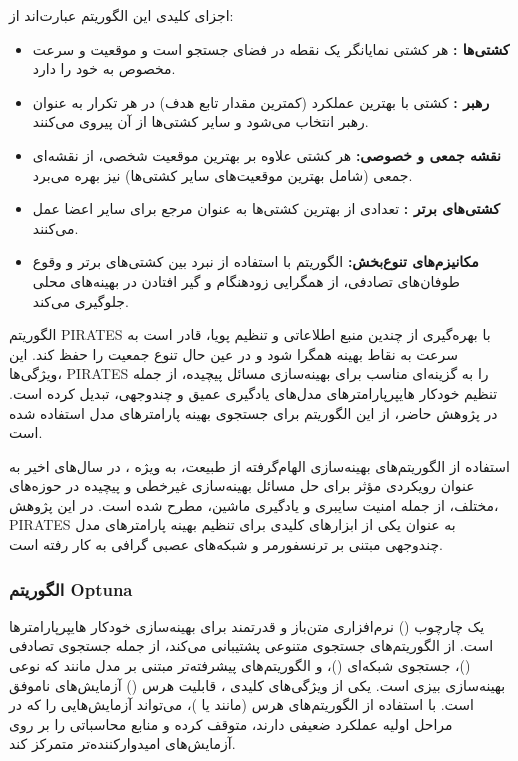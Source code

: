 اجزای کلیدی این الگوریتم عبارت‌اند از:
\begin{itemize}
    \item \textbf{کشتی‌ها :} هر کشتی نمایانگر یک نقطه در فضای جستجو است و موقعیت و سرعت مخصوص به خود را دارد.
    \item \textbf{رهبر :} کشتی با بهترین عملکرد (کمترین مقدار تابع هدف) در هر تکرار به عنوان رهبر انتخاب می‌شود و سایر کشتی‌ها از آن پیروی می‌کنند.
    \item \textbf{نقشه جمعی و خصوصی:} هر کشتی علاوه بر بهترین موقعیت شخصی، از نقشه‌ای جمعی (شامل بهترین موقعیت‌های سایر کشتی‌ها) نیز بهره می‌برد.
    \item \textbf{کشتی‌های برتر :} تعدادی از بهترین کشتی‌ها به عنوان مرجع برای سایر اعضا عمل می‌کنند.
    \item \textbf{مکانیزم‌های تنوع‌بخش:} الگوریتم با استفاده از نبرد بین کشتی‌های برتر و وقوع طوفان‌های تصادفی، از همگرایی زودهنگام و گیر افتادن در بهینه‌های محلی جلوگیری می‌کند.
\end{itemize}

الگوریتم PIRATES با بهره‌گیری از چندین منبع اطلاعاتی و تنظیم پویا، قادر است به سرعت به نقاط بهینه همگرا شود و در عین حال تنوع جمعیت را حفظ کند. این ویژگی‌ها، PIRATES را به گزینه‌ای مناسب برای بهینه‌سازی مسائل پیچیده، از جمله تنظیم خودکار هایپرپارامترهای مدل‌های یادگیری عمیق و چندوجهی، تبدیل کرده است. در پژوهش حاضر، از این الگوریتم برای جستجوی بهینه پارامترهای مدل استفاده شده است.

استفاده از الگوریتم‌های بهینه‌سازی الهام‌گرفته از طبیعت، به ویژه ، در سال‌های اخیر به عنوان رویکردی مؤثر برای حل مسائل بهینه‌سازی غیرخطی و پیچیده در حوزه‌های مختلف، از جمله امنیت سایبری و یادگیری ماشین، مطرح شده است. در این پژوهش، PIRATES به عنوان یکی از ابزارهای کلیدی برای تنظیم بهینه پارامترهای مدل چندوجهی مبتنی بر ترنسفورمر و شبکه‌های عصبی گرافی به کار رفته است.

\subsubsection{الگوریتم Optuna}
 \cite{Optuna2019} یک چارچوب () نرم‌افزاری متن‌باز و قدرتمند برای بهینه‌سازی خودکار هایپرپارامترها است.  از الگوریتم‌های جستجوی متنوعی پشتیبانی می‌کند، از جمله جستجوی تصادفی ()، جستجوی شبکه‌ای ()، و الگوریتم‌های پیشرفته‌تر مبتنی بر مدل مانند  که نوعی بهینه‌سازی بیزی است. یکی از ویژگی‌های کلیدی ، قابلیت هرس () آزمایش‌های ناموفق است. با استفاده از الگوریتم‌های هرس (مانند  یا )،  می‌تواند آزمایش‌هایی را که در مراحل اولیه عملکرد ضعیفی دارند، متوقف کرده و منابع محاسباتی را بر روی آزمایش‌های امیدوارکننده‌تر متمرکز کند.

